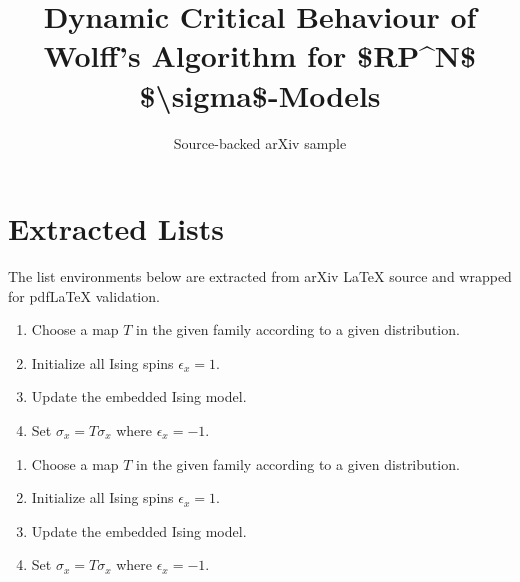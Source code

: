 \documentclass[11pt]{article}
\title{Dynamic Critical Behaviour of Wolff's Algorithm for \$RP\textasciicircum{}N\$
  \$\textbackslash{}sigma\$-Models}
\author{Source-backed arXiv sample}
\date{}
\begin{document}
\maketitle
\section{Extracted Lists}

The list environments below are extracted from arXiv LaTeX source and wrapped for pdfLaTeX validation.

\begin{itemize}
\begin{enumerate}
\item  Choose a map $T$ in the given family according to a given
distribution.
\item Initialize all Ising spins $\epsilon_x = 1$.
\item Update the embedded Ising model.
\item Set $\sigma_x = T\sigma_x$ where $\epsilon_x = -1$.
\end{enumerate}\end{itemize}

\begin{itemize}
\begin{enumerate}
\item  Choose a map $T$ in the given family according to a given
distribution.
\item Initialize all Ising spins $\epsilon_x = 1$.
\item Update the embedded Ising model.
\item Set $\sigma_x = T\sigma_x$ where $\epsilon_x = -1$.
\end{enumerate}\end{itemize}
\end{document}
